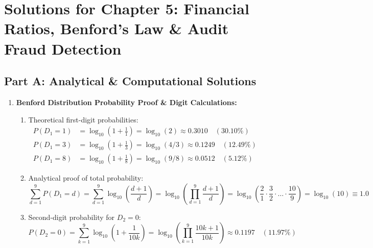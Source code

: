 \newpage
\section*{Solutions for Chapter 5: Financial Ratios, Benford's Law \& Audit Fraud Detection}

\subsection*{Part A: Analytical \& Computational Solutions}

\begin{enumerate}[label=\textbf{P5.\arabic*}]
    \item \textbf{Benford Distribution Probability Proof \& Digit Calculations:}
    \begin{enumerate}[label=(\alph*)]
        \item Theoretical first-digit probabilities:
        \begin{align*}
        P(D_1 = 1) &= \log_{10}\left(1 + \frac{1}{1}\right) = \log_{10}(2) \approx \mathbf{0.3010 \quad (30.10\%)} \\
        P(D_1 = 3) &= \log_{10}\left(1 + \frac{1}{3}\right) = \log_{10}(4/3) \approx \mathbf{0.1249 \quad (12.49\%)} \\
        P(D_1 = 8) &= \log_{10}\left(1 + \frac{1}{8}\right) = \log_{10}(9/8) \approx \mathbf{0.0512 \quad (5.12\%)}
        \end{align*}
        \item Analytical proof of total probability:
        \begin{equation*}
        \sum_{d=1}^9 P(D_1 = d) = \sum_{d=1}^9 \log_{10}\left(\frac{d + 1}{d}\right) = \log_{10}\left(\prod_{d=1}^9 \frac{d + 1}{d}\right) = \log_{10}\left(\frac{2}{1} \cdot \frac{3}{2} \cdot \dots \cdot \frac{10}{9}\right) = \log_{10}(10) \equiv \mathbf{1.0}
        \end{equation*}
        \item Second-digit probability for $D_2 = 0$:
        \begin{equation*}
        P(D_2 = 0) = \sum_{k=1}^9 \log_{10}\left(1 + \frac{1}{10k}\right) = \log_{10}\left(\prod_{k=1}^9 \frac{10k + 1}{10k}\right) \approx \mathbf{0.1197 \quad (11.97\%)}
        \end{equation*}
    \end{enumerate}


\end{enumerate}
